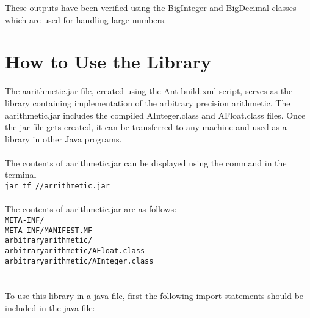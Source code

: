 \documentclass[a4paper,12pt]{article}
\begin{document}
These outputs have been verified using the BigInteger and BigDecimal classes which are used for handling large numbers.

\section{How to Use the Library}
 The aarithmetic.jar file, created using the Ant build.xml script, serves as the library containing implementation of the arbitrary precision arithmetic. The aarithmetic.jar includes the compiled AInteger.class and AFloat.class files. Once the jar file gets created, it can be transferred to any machine and used as a library in other Java programs.\\\\
 The contents of aarithmetic.jar can be displayed using the command in the terminal\\ \texttt{jar tf //arrithmetic.jar}\\\\The contents of aarithmetic.jar are as follows:\\
\texttt{META-INF/ \\
META-INF/MANIFEST.MF\\
arbitraryarithmetic/\\
arbitraryarithmetic/AFloat.class\\
arbitraryarithmetic/AInteger.class\\}\\\\
To use this library in a java file,  first the following import statements should be included in the java file:
\end{document}
